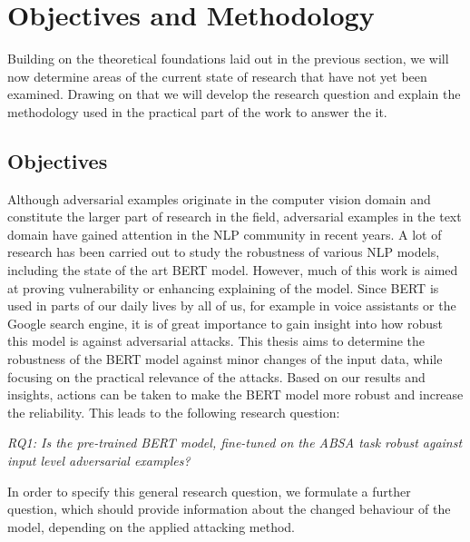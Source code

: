 
\section{Objectives and Methodology}
\label{sec:methodology}

Building on the theoretical foundations laid out in the previous section, we will now determine areas of the current state of research that have not yet been examined. Drawing on that we will develop the research question and explain the methodology used in the practical part of the work to answer the it. 

\subsection{Objectives}
\label{sec:objectives}

Although adversarial examples originate in the computer vision domain and constitute the larger part of research in the field, adversarial examples in the text domain have gained attention in the NLP community in recent years. A lot of research has been carried out to study the robustness of various NLP models, including the state of the art BERT model. 
However, much of this work is aimed at proving vulnerability or enhancing explaining of the model. 
Since BERT is used in parts of our daily lives by all of us, for example in voice assistants or the Google search engine, it is of great importance to gain insight into how robust this model is against adversarial attacks. 
This thesis aims to determine the robustness of the BERT model against minor changes of the input data, while focusing on the practical relevance of the attacks. Based on our results and insights, actions can be taken to make the BERT model more robust and increase the reliability. 
This leads to the following research question:

\textit{RQ1: Is the pre-trained BERT model, fine-tuned on the ABSA task robust against input level adversarial examples? }

In order to specify this general research question, we formulate a further question, which should provide information about the changed behaviour of the model, depending on the applied attacking method. 

